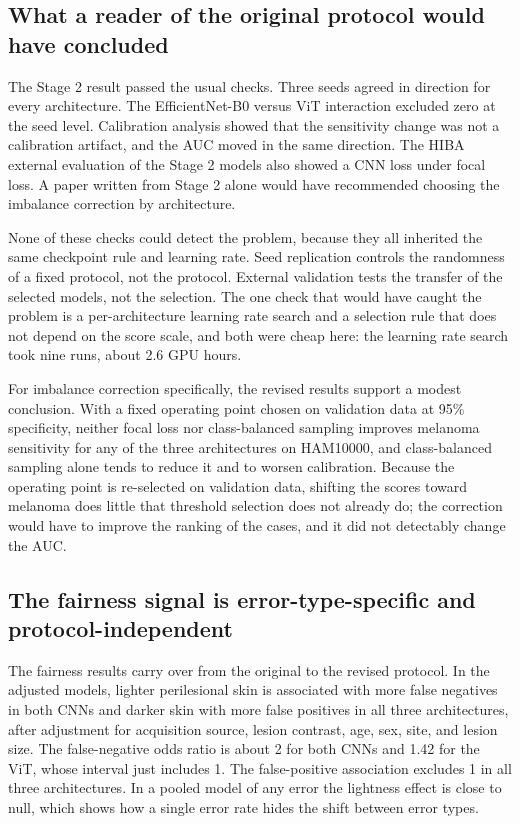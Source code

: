 \documentclass[11pt]{article}
\begin{document}
\subsection{What a reader of the original protocol would have concluded}

The Stage 2 result passed the usual checks. Three seeds agreed in direction for every architecture. The EfficientNet-B0 versus ViT interaction excluded zero at the seed level. Calibration analysis showed that the sensitivity change was not a calibration artifact, and the AUC moved in the same direction. The HIBA external evaluation of the Stage 2 models also showed a CNN loss under focal loss. A paper written from Stage 2 alone would have recommended choosing the imbalance correction by architecture.

None of these checks could detect the problem, because they all inherited the same checkpoint rule and learning rate. Seed replication controls the randomness of a fixed protocol, not the protocol. External validation tests the transfer of the selected models, not the selection. The one check that would have caught the problem is a per-architecture learning rate search and a selection rule that does not depend on the score scale, and both were cheap here: the learning rate search took nine runs, about 2.6 GPU hours.

For imbalance correction specifically, the revised results support a modest conclusion. With a fixed operating point chosen on validation data at 95\% specificity, neither focal loss nor class-balanced sampling improves melanoma sensitivity for any of the three architectures on HAM10000, and class-balanced sampling alone tends to reduce it and to worsen calibration. Because the operating point is re-selected on validation data, shifting the scores toward melanoma does little that threshold selection does not already do; the correction would have to improve the ranking of the cases, and it did not detectably change the AUC.

\subsection{The fairness signal is error-type-specific and protocol-independent}

The fairness results carry over from the original to the revised protocol. In the adjusted models, lighter perilesional skin is associated with more false negatives in both CNNs and darker skin with more false positives in all three architectures, after adjustment for acquisition source, lesion contrast, age, sex, site, and lesion size. The false-negative odds ratio is about 2 for both CNNs and 1.42 for the ViT, whose interval just includes 1. The false-positive association excludes 1 in all three architectures. In a pooled model of any error the lightness effect is close to null, which shows how a single error rate hides the shift between error types.
\end{document}

